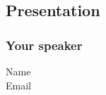 \subsection{Presentation}

\begin{frame}
  \frametitle{Your speaker}
  \begin{description}
  \item[Name] \UserName
  \item[Email] \UserEmail
  \end{description}
\end{frame}

